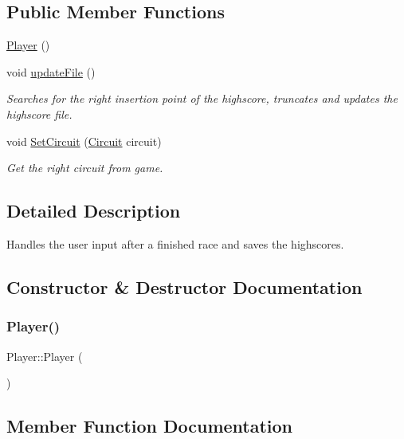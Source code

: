 \subsection*{Public Member Functions}
\begin{DoxyCompactItemize}
\item 
\mbox{\hyperlink{class_player_affe0cc3cb714f6deb4e62f0c0d3f1fd8}{Player}} ()
\item 
void \mbox{\hyperlink{class_player_a5393b97ffbc11743033b44a15e9eae04}{update\+File}} ()
\begin{DoxyCompactList}\small\item\em Searches for the right insertion point of the highscore, truncates and updates the highscore file. \end{DoxyCompactList}\item 
void \mbox{\hyperlink{class_player_a9ae683d200af27e5053abc0cd0d4e2de}{Set\+Circuit}} (\mbox{\hyperlink{player_8h_a9c0489b2664a5ac943d6f70b3a8dcd67}{Circuit}} circuit)
\begin{DoxyCompactList}\small\item\em Get the right circuit from game. \end{DoxyCompactList}\end{DoxyCompactItemize}


\subsection{Detailed Description}
Handles the user input after a finished race and saves the highscores. 

\subsection{Constructor \& Destructor Documentation}
\mbox{\label{class_player_affe0cc3cb714f6deb4e62f0c0d3f1fd8}} 
\subsubsection{\texorpdfstring{Player()}{Player()}}
{\footnotesize\ttfamily Player\+::\+Player (\begin{DoxyParamCaption}{ }\end{DoxyParamCaption})}



\subsection{Member Function Documentation}
\mbox{\label{class_player_afcd2ddce4619ffac88b5a4040c5b7833}} 
